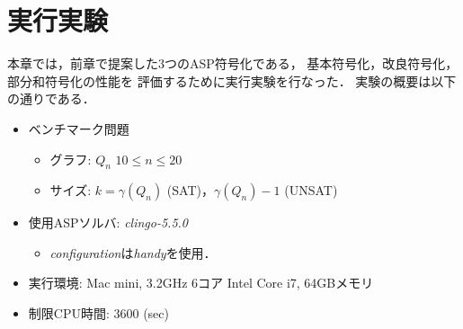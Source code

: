 \chapter{実行実験}\label{chap:experiment}
本章では，前章で提案した3つのASP符号化である，
基本符号化，改良符号化，部分和符号化の性能を
評価するために実行実験を行なった．
実験の概要は以下の通りである．
\begin{itemize}
 \item ベンチマーク問題
 \begin{itemize}
      \item グラフ: $Q_{n}$ $10 \le n \le 20$ 
      \item サイズ: $ k = \gamma(Q_n)$ (SAT)，$\gamma(Q_n)-1$ (UNSAT)%
 \end{itemize}
 \item 使用ASPソルバ: \textit{clingo-5.5.0}
       \begin{itemize}
	\item \textit{configuration}は\textit{handy}を使用．
       \end{itemize}
 \item 実行環境: Mac mini, 3.2GHz 6コア Intel Core i7, 64GBメモリ
 \item 制限CPU時間: 3600 (sec)
\end{itemize}

